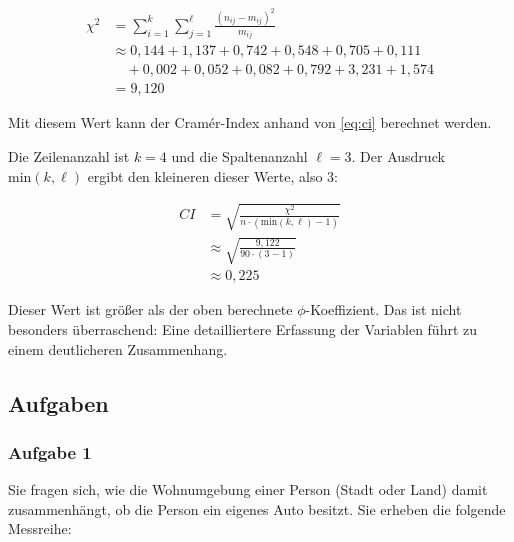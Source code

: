 \documentclass[
  ngerman,
]{article}
\begin{document}
\nopagebreak

\[\begin{aligned}
\chi^2&= \sum_{i=1}^{k}\sum_{j=1}^{\ell}\frac{(n_{ij}-m_{ij})^{2}}{m_{ij}}\\[4pt]
&\approx 0,144+1,137+0,742+0,548+0,705+0,111\\&\quad+0,002+0,052+0,082+0,792+3,231+1,574 \\
& =9,120
\end{aligned}\]

Mit diesem Wert kann der Cramér-Index anhand von \autoref{eq:ci} berechnet werden.

Die Zeilenanzahl ist \(k=4\) und die Spaltenanzahl \(\ell=3\). Der Ausdruck \(\mathrm{min}(k,\ell)\) ergibt den kleineren dieser Werte, also 3:

\[\begin{aligned}
\mathit{CI}&=\sqrt{\frac{\chi^2}{n\cdot (\mathrm{min}(k, \ell)-1)}}\\[6pt]
&\approx\sqrt{\frac{9,122}{90\cdot(3-1)}}\\[4pt]
&\approx0,225
\end{aligned}\]

Dieser Wert ist größer als der oben berechnete \(\phi\)-Koeffizient. Das ist nicht besonders überraschend: Eine detailliertere Erfassung der Variablen führt zu einem deutlicheren Zusammenhang.

\hypertarget{aufgaben-8}{%
\subsection{Aufgaben}\label{aufgaben-8}}

\hypertarget{aufgabe-1-8}{%
\subsubsection{Aufgabe 1}\label{aufgabe-1-8}}

Sie fragen sich, wie die Wohnumgebung einer Person (Stadt oder Land) damit zusammenhängt, ob die Person ein eigenes Auto besitzt. Sie erheben die folgende Messreihe:
\end{document}

